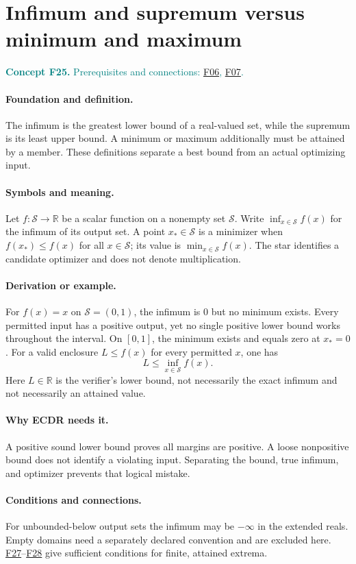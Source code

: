 \documentclass[11pt,a4paper]{article}
\newcommand{\R}{\mathbb R}
\newcommand{\conceptid}{Front matter}
\newcommand{\concept}[3]{\clearpage\renewcommand{\conceptid}{#1}%
\section{#2}\label{concept:#1}%
\textcolor{teal}{\textbf{Concept #1.} Prerequisites and connections: #3.}\par
\typeout{ECDR-CONCEPT-START #1 PAGE=\thepage}}
\begin{document}
\concept{F25}{Infimum and supremum versus minimum and maximum}{\hyperref[concept:F06]{F06}, \hyperref[concept:F07]{F07}}
\paragraph{Foundation and definition.}
The infimum is the greatest lower bound of a real-valued set, while the
supremum is its least upper bound. A minimum or maximum additionally
must be attained by a member. These definitions separate a best bound
from an actual optimizing input.
\paragraph{Symbols and meaning.}
Let $f:\mathcal S\to\R$ be a scalar function on a nonempty set
$\mathcal S$. Write
$\inf_{x\in\mathcal S}f(x)$ for the infimum of its output set.
A point $x_*\in\mathcal S$ is a minimizer when
$f(x_*)\le f(x)$ for all $x\in\mathcal S$; its value is
$\min_{x\in\mathcal S}f(x)$. The star identifies a candidate
optimizer and does not denote multiplication.
\paragraph{Derivation or example.}
For $f(x)=x$ on $\mathcal S=(0,1)$, the infimum is $0$ but no
minimum exists. Every permitted input has a positive output, yet no
single positive lower bound works throughout the interval. On
$[0,1]$, the minimum exists and equals zero at $x_*=0$.
For a valid enclosure $L\le f(x)$ for every permitted $x$, one has
\[
 L\le\inf_{x\in\mathcal S}f(x).
\]
Here $L\in\R$ is the verifier's lower bound, not necessarily the
exact infimum and not necessarily an attained value.
\paragraph{Why ECDR needs it.}
A positive sound lower bound proves all margins are positive. A loose
nonpositive bound does not identify a violating input. Separating the
bound, true infimum, and optimizer prevents that logical mistake.
\paragraph{Conditions and connections.}
For unbounded-below output sets the infimum may be $-\infty$ in the
extended reals. Empty domains need a separately declared convention and
are excluded here. \hyperref[concept:F27]{F27}--\hyperref[concept:F28]{F28} give sufficient conditions for finite,
attained extrema.
\par\label{endconcept:F25}
\end{document}
